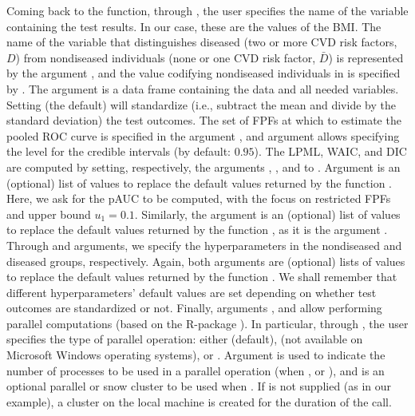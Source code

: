 Coming back to the  function, through , the user specifies the name of the variable containing the test results. In our case, these are the values of the BMI. The name of the variable that distinguishes diseased (two or more CVD risk factors, $D$) from nondiseased individuals (none or one CVD risk factor, $\bar{D}$) is represented by the argument , and the value codifying nondiseased individuals in  is specified by . The  argument is a data frame containing the data and all needed variables. Setting  (the default) will standardize (i.e., subtract the mean and divide by the standard deviation) the test outcomes. The set of FPFs at which to estimate the pooled ROC curve is specified in the argument , and argument  allows specifying the level for the credible intervals (by default: $0.95$). The LPML, WAIC, and DIC are computed by setting, respectively, the arguments , , and  to . Argument  is an (optional) list of values to replace the default values returned by the function . Here, we ask for the pAUC to be computed, with the focus on restricted FPFs and upper bound $u_1 = 0.1$. Similarly, the argument  is an (optional) list of values to replace the default values returned by the function , as it is the argument . Through  and  arguments, we specify the hyperparameters in the nondiseased and diseased groups, respectively. Again, both arguments are (optional) lists of values to replace the default values returned by the function . We shall remember that different hyperparameters' default values are set depending on whether test outcomes are standardized or not.  Finally, arguments ,  and  allow performing parallel computations (based on the R-package ). In particular, through , the user specifies the type of parallel operation: either  (default),  (not available on Microsoft Windows operating systems), or . Argument  is used to indicate the number of processes to be used in a parallel operation (when , or ), and  is an optional parallel or snow cluster to be used when . If  is not supplied (as in our example), a cluster on the local machine is created for the duration of the call.

